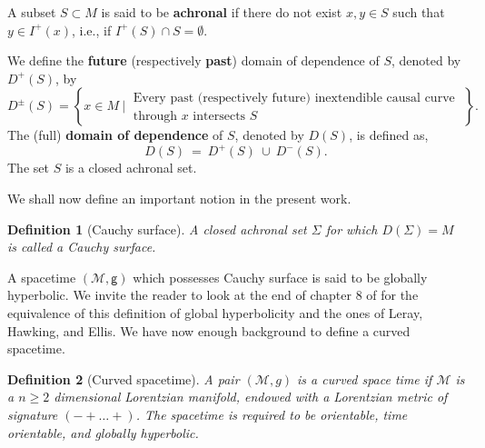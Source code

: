 \documentclass[10pt]{book}
\newcommand{\Mcal}{\mathcal{M}}
\newcommand{\gsf}{\mathsf{g}}
\theoremstyle{break}
\newtheorem{definition}{Definition}
\begin{document}
\bigskip


A subset $S \subset M$ is said to be \textbf{achronal} if there do not exist $x, y \in S$ such that $y \in I^{+}(x)$, i.e., if $I^{+}(S) \cap S = \emptyset$. 


\bigskip


We define the \textbf{future} (respectively \textbf{past}) domain of dependence of $S$, denoted by $D^{+}(S)$, by
%
\begin{equation*}
D^{\pm}(S) = \left\{ x \in M \ \bigg| \ \begin{array}{l} \text{Every past (respectively future) inextendible causal curve} \\ \text{through $x$ intersects $S$} \end{array} \; \right\}.
\end{equation*}
%
The (full) \textbf{domain of dependence} of $S$, denoted by $D(S)$, is defined as,
\begin{equation*}
D(S) \ = \ D^{+}(S) \ \cup \ D^{-}(S).
\end{equation*}
The set $S$ is a closed achronal set.


\bigskip


We shall now define an important notion in the present work.


\begin{definition}[Cauchy surface]
A closed achronal set $\Sigma$ for which $D(\Sigma) = M$ is called a Cauchy surface. 
\end{definition}

A spacetime $(\Mcal,\gsf)$ which possesses Cauchy surface is said to be globally hyperbolic. We invite the reader to look at the end of chapter $8$ of %
for the equivalence of this definition of global hyperbolicity and the ones of Leray, Hawking, and Ellis. 
We have now enough background to define a curved spacetime.

\begin{definition}[Curved spacetime]
A pair $(\Mcal,g)$ is a curved space time if $\Mcal$ is a $n \geq 2$ dimensional Lorentzian manifold, endowed with a Lorentzian metric of signature $( - + \dots +)$. The spacetime is required to be orientable, time orientable, and globally hyperbolic. 
\end{definition}
\end{document}
